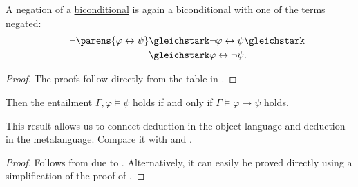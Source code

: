 \begin{proposition}
\begin{thmenum}
     A negation of a \hyperref[def:propositional_language/connectives/biconditional]{biconditional} is again a biconditional with one of the terms negated:
    \begin{equation}\label{eq:thm:boolean_equivalences/biconditional_negation}
      \begin{split}
        \mathllap{\neg \parens{\varphi \leftrightarrow \psi}}
        &\gleichstark
        \mathrlap{\neg \varphi \leftrightarrow \psi \gleichstark}
        \\ &\gleichstark
        \mathrlap{\varphi \leftrightarrow \neg \psi.}
      \end{split}
    \end{equation}
  \end{thmenum}
\end{proposition}
\begin{proof}
  The proofs follow directly from the table in .
\end{proof}

\begin{theorem}\label{thm:propositional_semantic_deduction_theorem}
  Then the entailment \( \Gamma, \varphi \vDash \psi \) holds if and only if \( \Gamma \vDash \varphi \to \psi \) holds.

  This result allows us to connect deduction in the object language and deduction in the metalanguage. Compare it with  and .
\end{theorem}
\begin{proof}
  Follows from  due to . Alternatively, it can easily be proved directly using a simplification of the proof of .
\end{proof}

